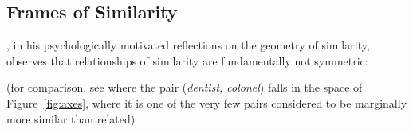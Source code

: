 \subsection{Frames of Similarity}
\cite{Tversky1977}, in his psychologically motivated reflections on the geometry of similarity, observes that relationships of similarity are fundamentally not symmetric: 

(for comparison, see where the pair (\emph{dentist, colonel}) falls in the space of Figure~\ref{fig:axes}, where it is one of the very few pairs considered to be marginally more similar than related)
